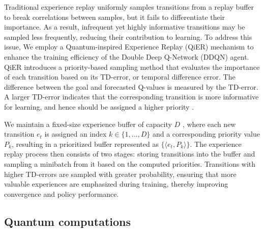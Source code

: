 \documentclass[journal]{IEEEtran}
\begin{document}
Traditional experience replay uniformly samples transitions from a replay buffer to break correlations between samples, but it fails to differentiate their importance. As a result, infrequent yet highly informative transitions may be sampled less frequently, reducing their contribution to learning.  To address this issue, We employ a Quantum-inspired Experience Replay (QiER) mechanism to enhance the training efficiency of the Double Deep Q-Network (DDQN) agent. QiER introduces a priority-based sampling method that evaluates the importance of each transition based on its TD-error, or temporal difference error. The difference between the goal and forecasted Q-values is measured by the TD-error. A larger TD-error indicates that the corresponding transition is more informative for learning, and hence should be assigned a higher priority \cite{10488443}.

We maintain a fixed-size experience buffer of capacity \( D \) \cite{9357477}, where each new transition \( e_t \) is assigned an index \( k \in \{1, \dots, D\} \) and a corresponding priority value \( P_k \), resulting in a prioritized buffer represented as \( \{\langle e_t, P_k \rangle\} \). The experience replay process then consists of two stages: storing transitions into the buffer and sampling a minibatch from it based on the computed priorities. Transitions with higher TD-errors are sampled with greater probability, ensuring that more valuable experiences are emphasized during training, thereby improving convergence and policy performance.


\subsection{Quantum computations}
\label{section:quantum_operation}
\end{document}
